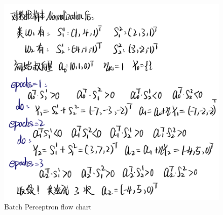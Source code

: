 \documentclass[homework]{IEEEtran}
\begin{document}
\begin{CJK}{UTF8}{gkai}
\begin{enumerate}
\begin{figure}[htb]
            \centerline{\includegraphics{Images/fig3.png}}
            \caption{Batch Perceptron flow chart}
            \label{fig} \par
        \end{figure}
    \end{enumerate}
\end{CJK}
\end{document}
